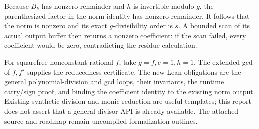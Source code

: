 Because \(B_k\) has nonzero remainder and \(h\) is invertible modulo
\(g\), the parenthesized factor in the norm identity has nonzero
remainder.  It follows that the norm is nonzero and its exact
\(g\)-divisibility order is \(s\).  A bounded scan of its actual output
buffer then returns a nonzero coefficient: if the scan failed, every
coefficient would be zero, contradicting the residue calculation.

For squarefree nonconstant rational \(f\), take \(g=f,e=1,h=1\).
The extended gcd of \(f,f'\) supplies the reducedness certificate.
The new Lean obligations are the general polynomial-division and gcd
loops, their invariants, the runtime carry/sign proof, and binding the
coefficient identity to the existing norm output.  Existing synthetic
division and monic reduction are useful templates; this report does not
assert that a general-divisor API is already available.
The attached source and roadmap remain uncompiled formalization outlines.
